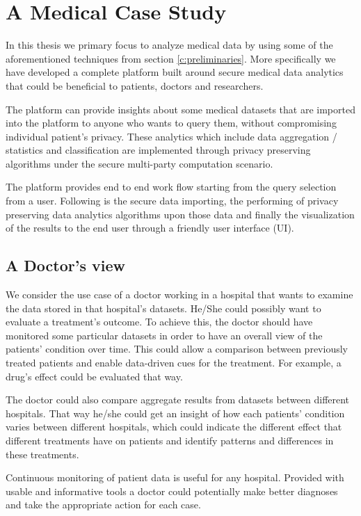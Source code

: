 \chapter{A Medical Case Study}\label{c:medical-study}

In this thesis we primary focus to analyze medical data by using some of the aforementioned techniques from section \ref{c:preliminaries}.
More specifically we have developed a complete platform built around secure medical data analytics that could be beneficial to patients, doctors and researchers.

The platform can provide insights about some medical datasets that are imported into the platform to anyone who wants to query them, without compromising individual patient's privacy.
These analytics which include data aggregation / statistics and classification are implemented through privacy preserving algorithms under the secure multi-party computation scenario.

The platform provides end to end work flow starting from the query selection from a user.
Following is the secure data importing, the performing of privacy preserving data analytics algorithms upon those data and finally the visualization of the results to the end user through a friendly user interface (UI).

\section{A Doctor's view}
We consider the use case of a doctor working in a hospital that wants to examine the data stored in that hospital's datasets.
He/She could possibly want to evaluate a treatment's outcome.
To achieve this, the doctor should have monitored some particular datasets in order to have an overall view of the patients' condition over time.
This could allow a comparison between previously treated patients and enable data-driven cues for the treatment.
For example, a drug's effect could be evaluated that way.

The doctor could also compare aggregate results from datasets between different hospitals.
That way he/she could get an insight of how each patients' condition varies between different hospitals, which could indicate the different effect that different treatments have on patients and identify patterns
and differences in these treatments.

Continuous monitoring of patient data is useful for any hospital.
Provided with usable and informative tools a doctor could potentially make better diagnoses and take the appropriate action for each case.


